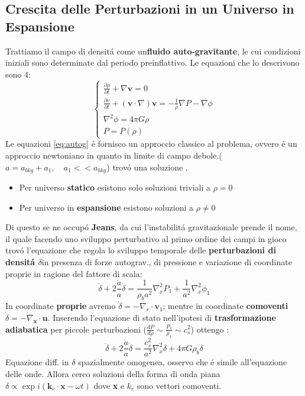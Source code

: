 \documentclass[12pt, a4paper]{article}
\begin{document}
\subsection{Crescita delle Perturbazioni in un Universo in Espansione}
Trattiamo il campo di densit\'{a} come un\textbf{fluido auto-gravitante}, le cui condizioni iniziali sono determinate dal periodo preinflattivo. Le equazioni che lo descrivono sono 4:
\begin{equation}
\begin{cases}
\frac{\partial \rho}{\partial t}+\nabla \textbf{v}=0 
\\
\frac{\partial v}{\partial t}+(\textbf{v}\cdot\nabla)\textbf{v}= -\frac{1}{\rho} \nabla P-\nabla \phi
\\
\nabla^2 \phi=4 \pi G \rho
\\
P=P(\rho)
\end{cases}
\label{eq:autog}
\end{equation}
Le equazioni \ref{eq:autog} \'{e} fornisco un approccio classico al problema, ovvero \'{e} un approccio newtoniano in quanto in limite di campo debole.($a=a_{bkg}+a_1, \quad a_1<<a_{bkg}$) trov\'{o} una soluzione .
\begin{itemize}
\item Per universo \textbf{statico} esistono solo soluzioni triviali a $\rho=0$
\item Per universo in \textbf{espansione} esistono soluzioni a $\rho \neq 0$
\end{itemize}
 Di questo se ne occup\'{o} \textbf{Jeans}, da cui l'instabilit\'{a} gravitazionale prende il nome, il quale facendo uno sviluppo perturbativo al primo ordine dei campi in gioco trov\'{o} l'equazione che regola lo sviluppo temporale delle \textbf{perturbazioni di densit\'{a} $\delta$}in presenza di forze autograv., di pressione e variazione di coordinate proprie in ragione del fattore di scala:
 \begin{equation}
 \ddot{\delta}+2\frac{\dot{a}}{a}\dot{\delta}=\frac{1}{\rho_b a^2}\nabla_x^2P_1+\frac{1}{a^2}\nabla_x^2\phi_1
 \end{equation}
 In coordinate \textbf{proprie} avremo $\dot{\delta}=-\nabla_r \cdot \textbf{v}_1$; mentre in coordinate \textbf{comoventi} $\dot{\delta}=-\nabla_{\textbf{x}}\cdot \textbf{u}$. Inserendo l'equazione di stato nell'ipotesi di \textbf{trasformazione adiabatica} per piccole perturbazioni ($\frac{dP}{d\rho}\sim \frac{P_1}{\rho_1}\sim c_s^2$) ottengo :
 \begin{equation}
 \ddot{\delta}+2\frac{\dot{a}}{a}\dot{\delta}=\frac{c_s^2}{a^2}\nabla_x^2\delta+4\pi G\rho_b \delta
 \end{equation}
 Equazione diff. in $\delta$ spazialmente omogenea, osservo che \'{e} simile all'equazione delle onde. Allora cerco soluzioni della forma di onda piana $\delta\propto \exp{i(\textbf{k}_c\cdot\textbf{x}-\omega t)}$ dove \textbf{x} e \textbf{$k_c$} sono vettori comoventi.
\end{document}
